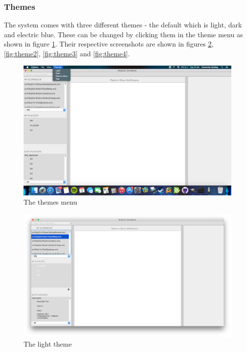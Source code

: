 \subsubsection{Themes}
The system comes with three different themes - the default which is light, dark and electric blue. These can be changed by clicking them in the theme menu as shown in figure \ref{fig:themes}. Their respective screenshots are shown in figures \ref{fig:theme1}, \ref{fig:theme2}, \ref{fig:theme3} and \ref{fig:theme4}.
\begin{figure}[H]
\centering
\includegraphics[width=500pt]{theme}
\caption{The themes menu}
\label{fig:themes}	
\end{figure}

\begin{figure}[H]
\centering
\includegraphics[width=400pt]{main_screenshot}
\caption{The light theme}
\label{fig:theme1}	
\end{figure}


